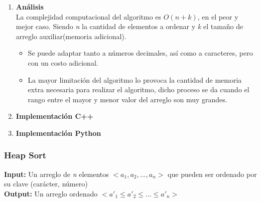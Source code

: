 \documentclass{article}
\begin{document}
                    \begin{enumerate}
                        \item \textbf{An\'{a}lisis}\\
                            La complejidad computacional del algoritmo es $O(n+k)$, en el peor y mejor caso. Siendo \textit{n} la cantidad de elementos a ordenar y \textit{k} el tamaño de arreglo auxiliar(memoria adicional).
                        \begin{itemize}
        		            \item Se puede adaptar tanto a números decimales, así como a caracteres, pero con un costo adicional.
        		            \item La mayor limitación del algoritmo lo provoca la cantidad de memoria extra necesaria para realizar el algoritmo, dicho proceso se da cuando el rango entre el mayor y menor valor del arreglo son muy grandes.
        		        \end{itemize}
                            
                            \item \textbf{Implementaci\'{o}n C++}
                    
                            
                            
                            \item \textbf{Implementaci\'{o}n Python}\\
                    
                            
                        
                    \end{enumerate}
		        
		        \subsubsection{Heap Sort}
		        
		            \begin{flushleft}
    		            \textbf{Input:} Un arreglo de \textit{n} elementos  $<a_1,a_2,...,a_n>$ que pueden ser ordenado por su clave (car\'{a}cter, n\'{u}mero)\\
    		            \textbf{Output:} Un arreglo ordenado $<a'_1 \leq a'_2 \leq ... \leq a'_n>$
		            \end{flushleft}
		            
\end{document}
